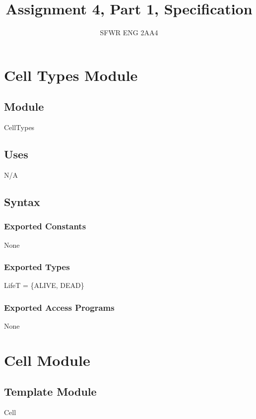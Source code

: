 \documentclass[]{article}
\begin{document}
\oddsidemargin -10mm
\evensidemargin -10mm
\textwidth 160mm
\textheight 200mm
\renewcommand\baselinestretch{1.0}

\pagestyle {plain}

\title{Assignment 4, Part 1, Specification}
\author{SFWR ENG 2AA4}
\maketitle


\newpage


\section*{Cell Types Module}

\subsection*{Module}
CellTypes

\subsection*{Uses}
N/A

\subsection*{Syntax}

\subsubsection* {Exported Constants}
None

\subsubsection* {Exported Types}
LifeT = \{ALIVE, DEAD\}\\

\subsubsection* {Exported Access Programs}

None

\newpage

\section*{Cell Module}
\subsection*{Template Module}
Cell
\end{document}
